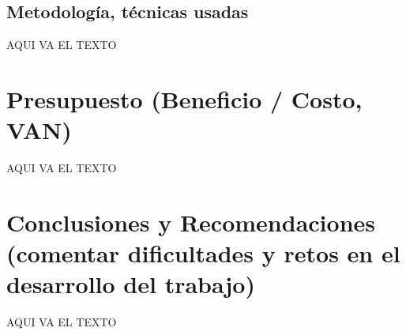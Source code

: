 \documentclass[preprint,12pt]{elsarticle}
\begin{document}
	\subsection{Metodología, técnicas usadas }	
		AQUI VA EL TEXTO
	
\section{Presupuesto (Beneficio / Costo, VAN)}
AQUI VA EL TEXTO

\section{Conclusiones y Recomendaciones (comentar dificultades y retos en el desarrollo del trabajo)}
AQUI VA EL TEXTO



	
	\newpage
	

    

	
\end{document}
